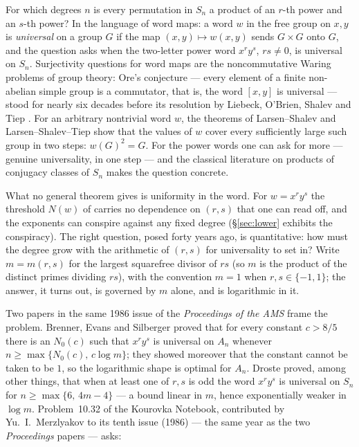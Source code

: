 \documentclass[11pt]{amsart}
\numberwithin{equation}{section}
\theoremstyle{remark}
\begin{document}
For which degrees $n$ is every permutation in $S_n$ a product of an $r$-th power
and an $s$-th power? In the language of word maps: a word $w$ in the free group
on $x,y$ is \emph{universal} on a group $G$ if the map $(x,y)\mapsto w(x,y)$
sends $G\times G$ onto $G$, and the question asks when the two-letter power word
$x^ry^s$, $rs\neq0$, is universal on $S_n$. Surjectivity questions for word maps
are the noncommutative Waring problems of group theory: Ore's conjecture ---
every element of a finite non-abelian simple group is a commutator, that is,
the word $[x,y]$ is universal --- stood for nearly six decades before its
resolution by Liebeck, O'Brien, Shalev and Tiep \cite{LOST}. For an arbitrary
nontrivial word $w$, the theorems of Larsen--Shalev and Larsen--Shalev--Tiep
\cite{LaSh,LST} show that the values of $w$ cover every sufficiently large such
group in two steps: $w(G)^2=G$. For the power words one can ask for more --- genuine universality,
in one step --- and the classical literature on products of conjugacy classes
of $S_n$ makes the question concrete.

What no general theorem gives is uniformity in the word. For $w=x^ry^s$ the
threshold $N(w)$ of \cite{LaSh} carries no dependence on $(r,s)$ that one can
read off, and the exponents can conspire against any fixed degree
(\S\ref{sec:lower} exhibits the conspiracy). The right question, posed forty
years ago, is quantitative: how must the degree grow with the arithmetic of
$(r,s)$ for universality to set in? Write $m=m(r,s)$ for the largest squarefree
divisor of $rs$ (so $m$ is the product of the distinct primes dividing $rs$),
with the convention $m=1$ when $r,s\in\{-1,1\}$; the answer, it turns out, is
governed by $m$ alone, and is logarithmic in it.

Two papers in the same 1986 issue of the \emph{Proceedings of the AMS} frame the
problem. Brenner, Evans and Silberger \cite{BES} proved that for every constant
$c>8/5$ there is an $N_0(c)$ such that $x^ry^s$ is universal on $A_n$ whenever
$n\ge\max\{N_0(c),\,c\log m\}$; they showed moreover that the constant cannot be
taken to be $1$, so the logarithmic shape is optimal for $A_n$. Droste \cite{Droste}
proved, among other things, that when at least one of $r,s$ is odd the word
$x^ry^s$ is universal on $S_n$ for $n\ge\max\{6,\,4m-4\}$ --- a bound linear in
$m$, hence exponentially weaker in $\log m$. Problem~10.32 of the Kourovka
Notebook, contributed by Yu.~I.~Merzlyakov \cite{KN} to its tenth issue (1986)
--- the same year as the two \emph{Proceedings} papers --- asks:
\end{document}
